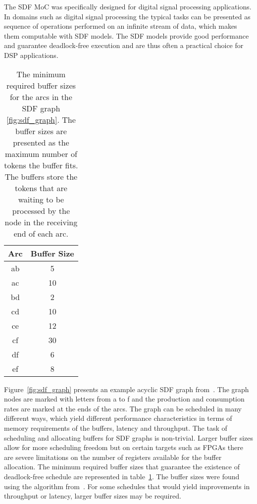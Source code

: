 The SDF MoC was specifically designed for digital signal processing applications. In domains such as digital signal processing the typical tasks can be presented as sequence of operations performed on an infinite stream of data, which makes them computable with SDF models. The SDF models provide good performance and guarantee deadlock-free execution and are thus often a practical choice for DSP applications.~\cite{lee2015introduction}

\begin{table}
    \begin{center}
        \begin{tabular}{ c c }
            Arc & Buffer Size \\ \hline
            ab  & 5 \\ \hline
            ac  & 10 \\ \hline
            bd  & 2 \\ \hline
            cd  & 10 \\ \hline
            ce  & 12 \\ \hline
            cf  & 30 \\ \hline
            df  & 6 \\ \hline
            ef  & 8 \\ \hline
        \end{tabular}
        \caption{The minimum required buffer sizes for the arcs in the SDF graph \ref{fig:sdf_graph}. The buffer sizes are presented as the maximum number of tokens the buffer fits. The buffers store the tokens that are waiting to be processed by the node in the receiving end of each arc.}
        \label{tab:sdf_buffers}
    \end{center}
\end{table}

Figure~\ref{fig:sdf_graph} presents an example acyclic SDF graph from~\cite{ade1997data}. The graph nodes are marked with letters from a to f and the production and consumption rates are marked at the ends of the arcs. The graph can be scheduled in many different ways, which yield different performance characteristics in terms of memory requirements of the buffers, latency and throughput. The task of scheduling and allocating buffers for SDF graphs is non-trivial. Larger buffer sizes allow for more scheduling freedom but on certain targets such as FPGAs there are severe limitations on the number of registers available for the buffer allocation. The minimum required buffer sizes that guarantee the existence of deadlock-free schedule are represented in table~\ref{tab:sdf_buffers}. The buffer sizes were found using the algorithm from~\cite{ade1997data}. For some schedules that would yield improvements in throughput or latency, larger buffer sizes may be required.

